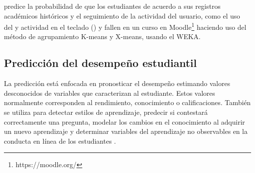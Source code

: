 \textcite{moreno2009data} predice la probabilidad de que los estudiantes de acuerdo a sus registros académicos históricos y el seguimiento de la actividad del usuario, como el uso del  y actividad en el teclado () y fallen en un curso  en Moodle\footnote{https://moodle.org/} haciendo uso del método de agrupamiento K-means y X-means, usando el  WEKA.






 
\subsection{Predicción del desempeño estudiantil}
La predicción está enfocada en pronosticar el desempeño estimando valores desconocidos de variables que caracterizan al estudiante. Estos valores normalmente corresponden al rendimiento, conocimiento o calificaciones. También se utiliza para detectar estilos de aprendizaje, predecir si contestará correctamente una pregunta, modelar los cambios en el conocimiento al adquirir un nuevo aprendizaje y determinar variables del aprendizaje no observables en la conducta en línea de los estudiantes \parencite{romero2010educational}. 

